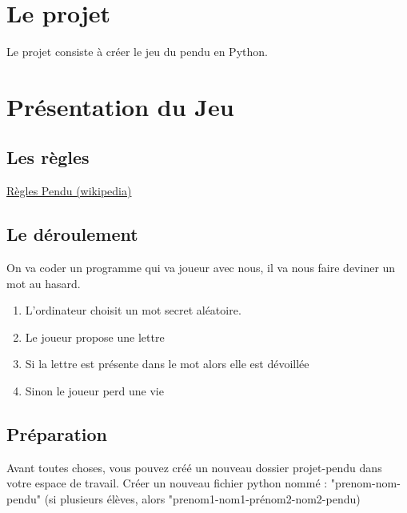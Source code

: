 \documentclass[12pt]{article}
\begin{document}
\begin{center} \Large \textbf{}
  \end{center}

\section{Le projet}
Le projet consiste à créer le jeu du pendu en Python.


\section{Présentation du Jeu}

\subsection{Les règles}
\href{https://fr.wikipedia.org/wiki/Pendu_(jeu)}{Règles Pendu (wikipedia)}

\subsection{Le déroulement}
On va coder un programme qui va joueur avec nous, il va nous faire deviner un mot au hasard.
\begin{enumerate}
    \item L'ordinateur choisit un mot secret aléatoire.
    \item Le joueur propose une lettre
    \item Si la lettre est présente dans le mot alors elle est dévoillée
    \item Sinon le joueur perd une vie
\end{enumerate}

\newpage
\subsection{Préparation}
Avant toutes choses, vous pouvez créé un nouveau dossier projet-pendu dans votre espace de travail.
Créer un nouveau fichier python nommé : "prenom-nom-pendu" (si plusieurs élèves, alors "prenom1-nom1-prénom2-nom2-pendu)
\end{document}
